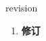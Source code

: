 
\begin{frame}
{\huge revision}
\begin{center}
\begin{enumerate}\Large
  \item \textbf{修订}
\end{enumerate}
\end{center}
\end{frame}
